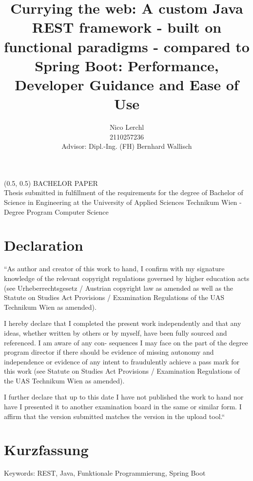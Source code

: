 \documentclass[a4paper]{article}
\title{
	Currying the web: A custom Java REST framework - built on functional paradigms
	- compared to Spring Boot: Performance, Developer Guidance and Ease of Use
}
\author{Nico Lerchl\\2110257236\\[0.5cm]{\small Advisor: Dipl.-Ing. (FH) Bernhard Wallisch}}
\begin{document}
\begin{textblock}{15}(0.5, 0.5)
	\noindent\Large BACHELOR PAPER\\
	\large Thesis submitted in fulfillment of the requirements for the degree of Bachelor
	of Science in Engineering at the University of Applied Sciences Technikum Wien
	- Degree Program Computer Science
\end{textblock}

\maketitle

\newpage

\section*{Declaration}
“As author and creator of this work to hand, I confirm with my signature knowledge of the relevant
copyright regulations governed by higher education acts (see Urheberrechtsgesetz / Austrian
copyright law as amended as well as the Statute on Studies Act Provisions / Examination
Regulations of the UAS Technikum Wien as amended).\newline

\noindent I hereby declare that I completed the present work independently and that any ideas, whether
written by others or by myself, have been fully sourced and referenced. I am aware of any con-
sequences I may face on the part of the degree program director if there should be evidence of
missing autonomy and independence or evidence of any intent to fraudulently achieve a pass
mark for this work (see Statute on Studies Act Provisions / Examination Regulations of the UAS
Technikum Wien as amended).\newline

\noindent I further declare that up to this date I have not published the work to hand nor have I presented
it to another examination board in the same or similar form. I affirm that the version submitted
matches the version in the upload tool.“


\newpage
\section*{Kurzfassung}
\blindtext
\newline

\noindent Keywords: REST, Java, Funktionale Programmierung, Spring Boot
\end{document}
